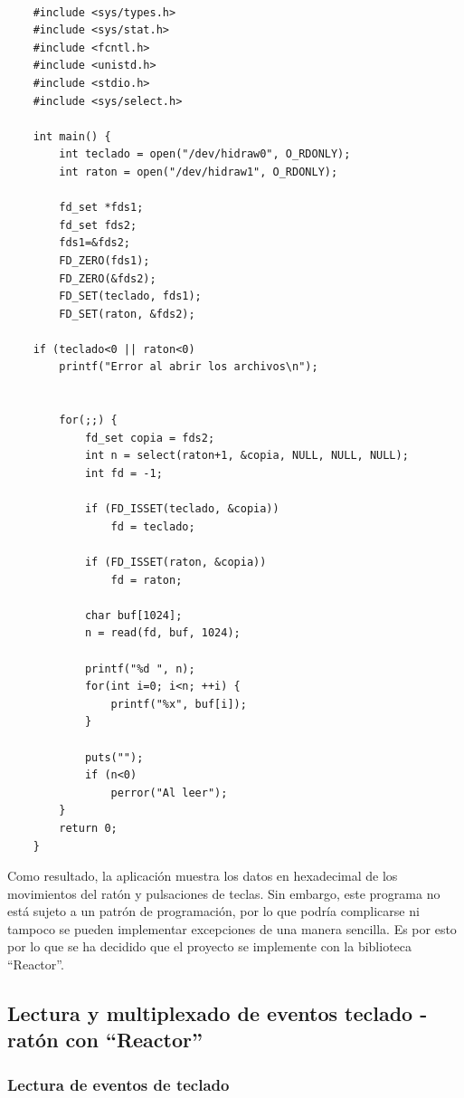 \begin{verbatim}
    
    #include <sys/types.h>
    #include <sys/stat.h>
    #include <fcntl.h>
    #include <unistd.h>
    #include <stdio.h>
    #include <sys/select.h>
    
    int main() {
    	int teclado = open("/dev/hidraw0", O_RDONLY);
    	int raton = open("/dev/hidraw1", O_RDONLY);
    
    	fd_set *fds1;
    	fd_set fds2;
    	fds1=&fds2;
    	FD_ZERO(fds1);
    	FD_ZERO(&fds2);
    	FD_SET(teclado, fds1);
    	FD_SET(raton, &fds2);
    
    if (teclado<0 || raton<0)
    	printf("Error al abrir los archivos\n");
    	
    
    	for(;;) {
    		fd_set copia = fds2;
    		int n = select(raton+1, &copia, NULL, NULL, NULL);
    		int fd = -1;
    
    		if (FD_ISSET(teclado, &copia))
    			fd = teclado;
    
    		if (FD_ISSET(raton, &copia))
    			fd = raton;
    
    		char buf[1024];
    		n = read(fd, buf, 1024);
    
    		printf("%d ", n);
    		for(int i=0; i<n; ++i) {
    			printf("%x", buf[i]);
    		}
    	
    		puts("");
    		if (n<0)
    			perror("Al leer");
    	}
    	return 0;
    }

    \end{verbatim}

Como resultado, la aplicación muestra los datos en hexadecimal de los movimientos del ratón y pulsaciones de teclas. Sin embargo, este programa no está sujeto a un patrón de programación, por lo que podría complicarse ni tampoco se pueden implementar excepciones de una manera sencilla. Es por esto por lo que se ha decidido que el proyecto se implemente con la biblioteca ``Reactor''.


\subsection{Lectura y multiplexado de eventos teclado - ratón con ``Reactor''} \label{s3_1_2}

\subsubsection{Lectura de eventos de teclado}\label{s3_1_2_1}

